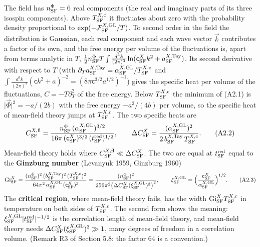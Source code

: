 \documentclass[
  10pt,
]{article}
\begin{document}
The field has \(n^\Phi_{\rm SF}=6\) real components (the real and
imaginary parts of its three isospin components). Above
\(T^{X,{\rm c}}_{\rm SF}\) it fluctuates about zero with the probability
density proportional to \(\exp(-\mathcal F^{X,{\rm GL}}_{\rm SF}/T)\).
To second order in the field the distribution is Gaussian, each real
component and each wave vector \(\vec k\) contributes a factor of its
own, and the free energy per volume of the fluctuations is, apart from
terms analytic in \(T\),
\(\tfrac12n^\Phi_{\rm SF}T\int\frac{d^3k}{(2\pi)^3}\ln(\mathsf c^X_{\rm SF}k^2+a^{X,{\rm Tay}}_{\rm SF})\).
Its second derivative with respect to \(T\) (with
\(\partial_Ta^{X,{\rm Tay}}_{\rm SF}=\alpha^{X,{\rm GL}}_{\rm SF}/T^{X,{\rm c}}_{\rm SF}\)
and
\(\int\frac{d^3k}{(2\pi)^3}(\mathsf c k^2+a)^{-2}=(8\pi\mathsf c^{3/2}a^{1/2})^{-1}\))
gives the specific heat per volume of the fluctuations,
\(C=-T\partial_T^2\) of the free energy. Below
\(T^{X,{\rm c}}_{\rm SF}\) the minimum of (A2.1) is
\(\lvert\vec\Phi\rvert^2=-a/(2b)\) with the free energy \(-a^2/(4b)\)
per volume, so the specific heat of mean-field theory jumps at
\(T^{X,{\rm c}}_{\rm SF}\). The two specific heats are
\[C^{X,{\rm fl}}_{\rm SF}=\frac{n^\Phi_{\rm SF}\,(\alpha^{X,{\rm GL}}_{\rm SF})^{3/2}}{16\pi\,(\mathsf c^X_{\rm SF})^{3/2}\,(t^{\rm red}_{\rm SF})^{1/2}},\qquad\Delta C^X_{\rm SF}=\frac{(\alpha^{X,{\rm GL}}_{\rm SF})^2}{2\,b^{X,{\rm Tay}}_{\rm SF}\,T^{X,{\rm c}}_{\rm SF}}.\tag{A2.2}\]
Mean-field theory holds where
\(C^{X,{\rm fl}}_{\rm SF}\ll\Delta C^X_{\rm SF}\). The two are equal at
\(t^{\rm red}_{\rm SF}\) equal to the \textbf{Ginzburg number} (Levanyuk
1959, Ginzburg 1960)
\[{\rm Gi}^{X}_{\rm SF}=\frac{(n^\Phi_{\rm SF})^2\,(b^{X,{\rm Tay}}_{\rm SF})^2\,(T^{X,{\rm c}}_{\rm SF})^2}{64\pi^2\,\alpha^{X,{\rm GL}}_{\rm SF}\,(\mathsf c^X_{\rm SF})^3}=\frac{(n^\Phi_{\rm SF})^2}{256\pi^2\big(\Delta C^X_{\rm SF}(\xi^{X,{\rm GL}}_{\rm SF})^3\big)^2},\qquad\xi^{X,{\rm GL}}_{\rm SF}=\Big(\frac{\mathsf c^X_{\rm SF}}{\alpha^{X,{\rm GL}}_{\rm SF}}\Big)^{1/2}.\tag{A2.3}\]
The \textbf{critical region}, where mean-field theory fails, has the
width \({\rm Gi}^{X}_{\rm SF}T^{X,{\rm c}}_{\rm SF}\) in temperature on
both sides of \(T^{X,{\rm c}}_{\rm SF}\). The second form shows the
meaning:
\(\xi^{X,{\rm GL}}_{\rm SF}\lvert t^{\rm red}_{\rm SF}\rvert^{-1/2}\) is
the correlation length of mean-field theory, and mean-field theory needs
\(\Delta C^X_{\rm SF}(\xi^{X,{\rm GL}}_{\rm SF})^3\gg1\), many degrees
of freedom in a correlation volume. (Remark R3 of Section 5.8: the
factor 64 is a convention.)
\end{document}
